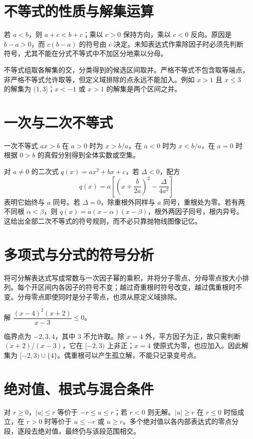 \documentclass[UTF8]{ctexbook}
\begin{document}
\section{不等式的性质与解集运算}
若 $a<b$，则 $a+c<b+c$；乘以 $c>0$ 保持方向，乘以 $c<0$ 反向。原因是 $b-a>0$，而 $c(b-a)$ 的符号由 $c$ 决定。未知表达式作乘除因子时必须先判断符号，尤其不能在分式不等式中不加区分地乘以分母。

不等式组取各解集的交，分类得到的候选区间取并。严格不等式不包含取等端点，非严格不等式允许取等，但定义域排除的点永远不能加入。例如 $x>1$ 且 $x\le3$ 的解集为 $(1,3]$；$x<-1$ 或 $x>1$ 的解集是两个区间之并。

\section{一次与二次不等式}
一次不等式 $ax>b$ 在 $a>0$ 时为 $x>b/a$，在 $a<0$ 时为 $x<b/a$，在 $a=0$ 时根据 $0>b$ 的真假分别得到全体实数或空集。

对 $a\ne0$ 的二次式 $q(x)=ax^2+bx+c$，若 $\Delta<0$，配方
\[
 q(x)=a\left[\left(x+\frac b{2a}\right)^2-\frac{\Delta}{4a^2}\right]
\]
表明它始终与 $a$ 同号。若 $\Delta=0$，除重根外同样与 $a$ 同号，重根处为零。若有两不同根 $\alpha<\beta$，则 $q(x)=a(x-\alpha)(x-\beta)$，根外两因子同号，根内异号。这给出全部二次不等式的符号规则，而不必只靠抛物线图像记忆。

\section{多项式与分式的符号分析}
将可分解表达式写成常数与一次因子幂的乘积，并将分子零点、分母零点按大小排列。每个开区间内各因子的符号不变；越过奇重根时符号改变，越过偶重根时不变。分母零点即使同时是分子零点，也须从原定义域排除。

\begin{example}
解 $\dfrac{(x-4)^2(x+2)}{x-3}\le0$。
\end{example}
\begin{solve}
临界点为 $-2,3,4$，其中 $3$ 不允许取。除 $x=4$ 外，平方因子为正，故只需判断 $(x+2)/(x-3)$，它在 $[-2,3)$ 上非正；$x=4$ 使原式为零，也应加入。因此解集为 $[-2,3)\cup\{4\}$。偶重根可以产生孤立解，不能只记录变号点。
\end{solve}

\section{绝对值、根式与混合条件}
对 $r\ge0$，$|u|\le r$ 等价于 $-r\le u\le r$；若 $r<0$ 则无解。$|u|\ge r$ 在 $r\le0$ 时恒成立，在 $r>0$ 时等价于 $u\le-r$ 或 $u\ge r$。多个绝对值以各内部表达式的零点分段，逐段去绝对值，最终仍与该段范围相交。
\end{document}
